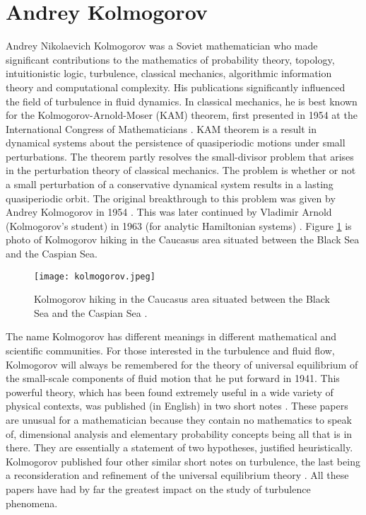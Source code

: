 \documentclass[12pt,oneside,a4paper,english]{article}
\begin{document}
\section{Andrey Kolmogorov}
Andrey Nikolaevich Kolmogorov was a Soviet mathematician who made significant contributions to the mathematics of probability theory, topology, intuitionistic logic, turbulence, classical mechanics, algorithmic information theory and computational complexity. His publications significantly influenced the field of turbulence in fluid dynamics. In classical mechanics, he is best known for the Kolmogorov-Arnold-Moser (KAM) theorem, first presented in 1954 at the International Congress of Mathematicians \cite{Chierchia2008}. KAM theorem is a result in dynamical systems about the persistence of quasiperiodic motions under small perturbations. The theorem partly resolves the small-divisor problem that arises in the perturbation theory of classical mechanics. The problem is whether or not a small perturbation of a conservative dynamical system results in a lasting quasiperiodic orbit. The original breakthrough to this problem was given by Andrey Kolmogorov in 1954  \cite{Chierchia2008}. This was later continued by Vladimir Arnold (Kolmogorov's student) in 1963 (for analytic Hamiltonian systems) \cite{ASNSP_1994_4_21_4_541_0}. Figure \ref{fig_kol_hiking_1} is photo of Kolmogorov hiking in the Caucasus area situated between the Black Sea and the Caspian Sea.

\begin{figure}[ht]
    \centering
    \texttt{[image: kolmogorov.jpeg]}
    \caption[Kolmogorov hiking in the Caucasus area ]{Kolmogorov hiking in the Caucasus area situated between the Black Sea and the Caspian Sea \cite{Kendall1991}.}
    \label{fig_kol_hiking_1}
\end{figure}

The name Kolmogorov has different meanings in different mathematical and scientific communities. For those interested in the turbulence and fluid flow, Kolmogorov will always be remembered for the theory of universal equilibrium of the small-scale components of fluid motion that he put forward in 1941. This powerful theory, which has been found extremely useful in a wide variety of physical contexts, was published (in English) in two short notes \cite{Kendall1991}. These papers are unusual for a mathematician because they contain no mathematics to speak of, dimensional analysis and elementary probability concepts being all that is in there. They are essentially a statement of two hypotheses, justified heuristically. Kolmogorov published four other similar short notes on turbulence, the last being a reconsideration and refinement of the universal equilibrium theory \cite{Kendall1991}. All these papers have had by far the greatest impact on the study of turbulence phenomena.
\end{document}
